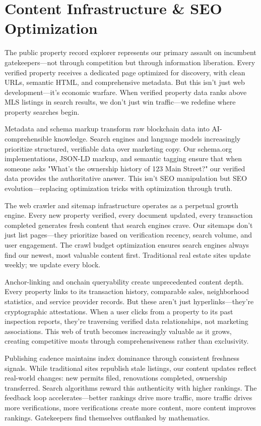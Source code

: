 \section{Content Infrastructure & SEO Optimization}

The public property record explorer represents our primary assault on incumbent gatekeepers—not through competition but through information liberation. Every verified property receives a dedicated page optimized for discovery, with clean URLs, semantic HTML, and comprehensive metadata. But this isn't just web development—it's economic warfare. When verified property data ranks above MLS listings in search results, we don't just win traffic—we redefine where property searches begin.

Metadata and schema markup transform raw blockchain data into AI-comprehensible knowledge. Search engines and language models increasingly prioritize structured, verifiable data over marketing copy. Our schema.org implementations, JSON-LD markup, and semantic tagging ensure that when someone asks "What's the ownership history of 123 Main Street?" our verified data provides the authoritative answer. This isn't SEO manipulation but SEO evolution—replacing optimization tricks with optimization through truth.

The web crawler and sitemap infrastructure operates as a perpetual growth engine. Every new property verified, every document updated, every transaction completed generates fresh content that search engines crave. Our sitemaps don't just list pages—they prioritize based on verification recency, search volume, and user engagement. The crawl budget optimization ensures search engines always find our newest, most valuable content first. Traditional real estate sites update weekly; we update every block.

Anchor-linking and onchain queryability create unprecedented content depth. Every property links to its transaction history, comparable sales, neighborhood statistics, and service provider records. But these aren't just hyperlinks—they're cryptographic attestations. When a user clicks from a property to its past inspection reports, they're traversing verified data relationships, not marketing associations. This web of truth becomes increasingly valuable as it grows, creating competitive moats through comprehensiveness rather than exclusivity.

Publishing cadence maintains index dominance through consistent freshness signals. While traditional sites republish stale listings, our content updates reflect real-world changes: new permits filed, renovations completed, ownership transferred. Search algorithms reward this authenticity with higher rankings. The feedback loop accelerates—better rankings drive more traffic, more traffic drives more verifications, more verifications create more content, more content improves rankings. Gatekeepers find themselves outflanked by mathematics.

